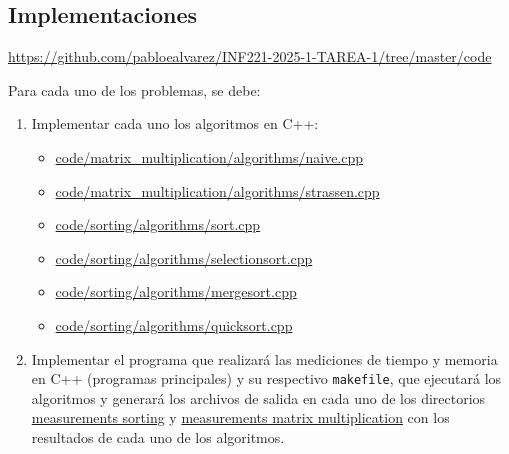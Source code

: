 
\subsection{Implementaciones}

\begin{mdframed}

    \begin{center}
    
    \url{https://github.com/pabloealvarez/INF221-2025-1-TAREA-1/tree/master/code}
        
\end{center}
\end{mdframed}

Para cada uno de los problemas, se debe:
\begin{enumerate}[(1)]
    \item Implementar cada uno los algoritmos en C++:
    \begin{itemize}
        \item \href{https://github.com/pabloealvarez/INF221-2025-1-TAREA-1/blob/master/code/matrix_multiplication/algorithms/naive.cpp}{code/matrix\_multiplication/algorithms/naive.cpp}
        \item \href{https://github.com/pabloealvarez/INF221-2025-1-TAREA-1/blob/master/code/matrix_multiplication/algorithms/strassen.cpp}{code/matrix\_multiplication/algorithms/strassen.cpp}
        \item \href{https://github.com/pabloealvarez/INF221-2025-1-TAREA-1/blob/master/code/sorting/algorithms/sort.cpp}{code/sorting/algorithms/sort.cpp}
        \item \href{https://github.com/pabloealvarez/INF221-2025-1-TAREA-1/blob/master/code/sorting/algorithms/selectionsort.cpp}{code/sorting/algorithms/selectionsort.cpp}
        \item \href{https://github.com/pabloealvarez/INF221-2025-1-TAREA-1/blob/master/code/sorting/algorithms/mergesort.cpp}{code/sorting/algorithms/mergesort.cpp}
        \item \href{https://github.com/pabloealvarez/INF221-2025-1-TAREA-1/blob/master/code/sorting/algorithms/quicksort.cpp}{code/sorting/algorithms/quicksort.cpp}
    \end{itemize}
    \item Implementar el programa que realizará las mediciones de tiempo y memoria en C++ (programas principales) y su respectivo \texttt{makefile}, que ejecutará los algoritmos y generará los archivos de salida en cada uno de los directorios \href{https://github.com/pabloealvarez/INF221-2025-1-TAREA-1/blob/master/code/sorting/data/measurements/}{measurements sorting} y \href{https://github.com/pabloealvarez/INF221-2025-1-TAREA-1/blob/master/code/sortmatrix+multiplication/data/measurements/}{measurements matrix multiplication} con los resultados de cada uno de los algoritmos.

\end{enumerate}

